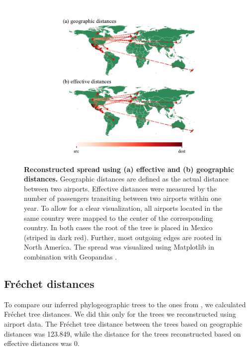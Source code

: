 \documentclass{article}
\begin{document}
\begin{figure}[!ht]
    \centering
    \includegraphics[width=\linewidth,trim={1.5cm 0 1.5cm 0}]{country_effective_country.pdf}
    \caption{\textbf{Reconstructed spread using (a) effective and (b) geographic distances.} Geographic distances are defined as the actual distance between two airports. Effective distances were measured by the number of passengers transiting between two airports within one year. To allow for a clear visualization, all airports located in the same country were mapped to the center of the corresponding country. In both cases the root of the tree is placed in Mexico (striped in dark red). Further, most outgoing edges are rooted in North America. The spread was visualized using Matplotlib \cite{MatplotlibVisualizationPython} in combination with Geopandas \cite{GeoPandas12GeoPandas}.}%
    \label{fig:world_comp}
\end{figure}


\subsection{Fr\'{e}chet distances}
To compare our inferred phylogeographic trees to the ones from \cite{reimeringPhylogeographicReconstructionUsing2020}, we calculated Fr\'{e}chet tree distances. We did this only for the trees we reconstructed using airport data. The Fr\'{e}chet tree distance between the trees based on geographic distances was 123.849, while the distance for the trees reconstructed based on effective distances was 0.
\end{document}
